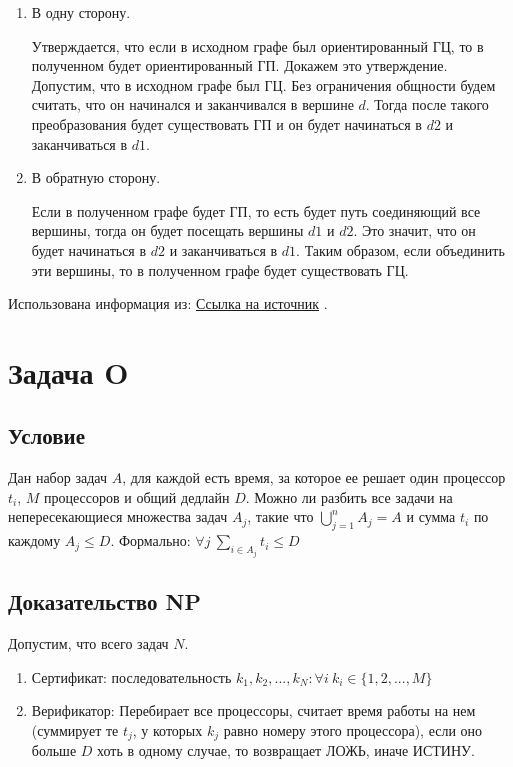 \documentclass{article}
\begin{document}
\begin{enumerate}
\item В одну сторону.

Утверждается, что если в исходном графе был ориентированный ГЦ, то в полученном будет ориентированный ГП. Докажем это утверждение. Допустим, что в исходном графе был ГЦ. Без ограничения общности будем считать, что он начинался и заканчивался в вершине $d$. Тогда после такого преобразования будет существовать ГП и он будет начинаться в $d2$ и заканчиваться в $d1$.

\item В обратную сторону.

Если в полученном графе будет ГП, то есть будет путь соединяющий все вершины, тогда он будет посещать вершины $d1$ и $d2$. Это значит, что он будет начинаться в $d2$ и заканчиваться в $d1$. Таким образом, если объединить эти вершины, то в полученном графе будет существовать ГЦ.


\end{enumerate}

Использована информация из: \href{https://neerc.ifmo.ru/wiki/index.php?title=NP-полнота_задач_о_гамильтоновом_цикле_и_пути_в_графах}{Ссылка на источник} .

\newpage

\section*{Задача O} 

\subsection*{Условие} 
Дан набор задач $A$, для каждой есть время, за которое ее решает один процессор  $t_i$, $M$ процессоров и общий дедлайн $D$. Можно ли разбить все задачи на непересекающиеся множества задач $A_j$, такие что $\bigcup_{j=1}^{n} A_j = A$ и сумма $t_i$ по каждому $A_j \leq D$. Формально: $\forall j\ \sum_{i \in A_j} t_i \leq D$

\subsection*{Доказательство NP}
Допустим, что всего задач $N$.
\begin{enumerate}
\item Сертификат: последовательность $k_1, k_2, ..., k_N: \forall i\ k_i \in \{1, 2, ..., M\}$
\item Верификатор: Перебирает все процессоры, считает время работы на нем (суммирует те $t_j$, у которых $k_j$ равно номеру этого процессора), если оно больше $D$ хоть в одному случае, то возвращает ЛОЖЬ, иначе ИСТИНУ.
\end{enumerate}
\end{document}

